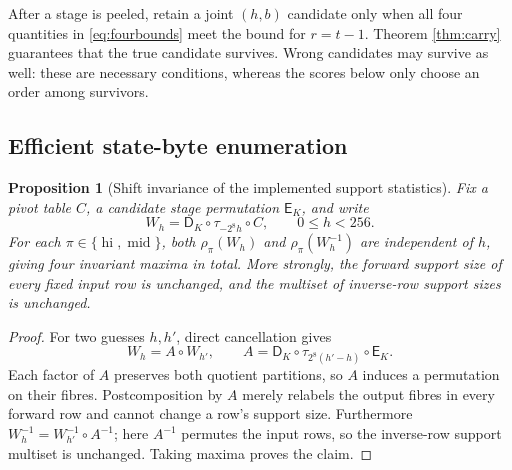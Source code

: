 \documentclass[10pt]{article}
\theoremstyle{plain}
\newtheorem{proposition}[theorem]{Proposition}
\theoremstyle{definition}
\theoremstyle{remark}
\newcommand{\E}{\mathsf E}
\newcommand{\D}{\mathsf D}
\newcommand{\hi}{\operatorname{hi}}
\newcommand{\midb}{\operatorname{mid}}
\begin{document}
After a stage is peeled, retain a joint \((h,b)\) candidate only when all four
quantities in \eqref{eq:fourbounds} meet the bound for \(r=t-1\).  Theorem
\ref{thm:carry} guarantees that the true candidate survives.  Wrong
candidates may survive as well: these are necessary conditions, whereas the
scores below only choose an order among survivors.

\subsection{Efficient state-byte enumeration}

\begin{proposition}[Shift invariance of the implemented support statistics]
\label{prop:shiftinvariant}
Fix a pivot table \(C\), a candidate stage permutation \(\E_K\), and write
\[
W_h=\D_K\circ\tau_{-2^8h}\circ C,
\qquad 0\leq h<256.
\]
For each \(\pi\in\{\hi,\midb\}\), both
\(\rho_\pi(W_h)\) and \(\rho_\pi(W_h^{-1})\) are independent of \(h\),
giving four invariant maxima in total.
More strongly, the forward support size of every fixed input row is unchanged,
and the multiset of inverse-row support sizes is unchanged.
\end{proposition}
\begin{proof}
For two guesses \(h,h'\), direct cancellation gives
\[
W_h=A\circ W_{h'},\qquad
A=\D_K\circ\tau_{2^8(h'-h)}\circ\E_K.
\]
Each factor of \(A\) preserves both quotient partitions, so \(A\) induces a
permutation on their fibres.  Postcomposition by \(A\) merely relabels the
output fibres in every forward row and cannot change a row's support size.
Furthermore \(W_h^{-1}=W_{h'}^{-1}\circ A^{-1}\); here \(A^{-1}\) permutes
the input rows, so the inverse-row support multiset is unchanged.  Taking
maxima proves the claim.
\end{proof}
\end{document}
